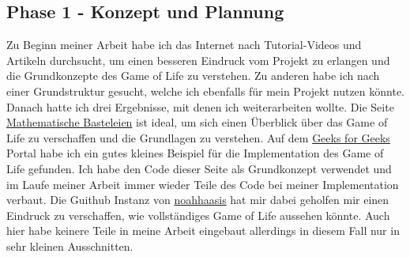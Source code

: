 \documentclass[11pt]{scrartcl}
\begin{document}
\subsection{Phase 1 - Konzept und Plannung}
Zu Beginn meiner Arbeit habe ich das Internet nach Tutorial-Videos und Artikeln durchsucht, um einen besseren Eindruck vom Projekt zu erlangen und die Grundkonzepte des Game of Life zu verstehen. Zu anderen habe ich nach einer Grundstruktur gesucht, welche ich ebenfalls für mein Projekt nutzen könnte.
Danach hatte ich drei Ergebnisse, mit denen ich weiterarbeiten wollte.
Die Seite \href{http://www.mathematische-basteleien.de/gameoflife.htm}{Mathematische Basteleien} ist ideal, um sich einen Überblick über das Game of Life zu verschaffen und die Grundlagen zu verstehen.
Auf dem \href{https://www.geeksforgeeks.org/program-for-conways-game-of-life/}{Geeks for Geeks} Portal habe ich ein gutes kleines Beispiel für die Implementation des Game of Life gefunden. Ich habe den Code
dieser Seite als Grundkonzept verwendet und im Laufe meiner Arbeit immer wieder Teile des Code bei meiner Implementation verbaut.
Die Guithub Instanz von \href{https://github.com/noahhaasis/conwaysGameOfLife}{noahhaasis} hat mir dabei geholfen mir einen Eindruck zu verschaffen, wie vollständiges Game of Life aussehen könnte. Auch hier habe keinere Teile in meine Arbeit eingebaut allerdings in diesem Fall nur in sehr kleinen Ausschnitten.
\end{document}

